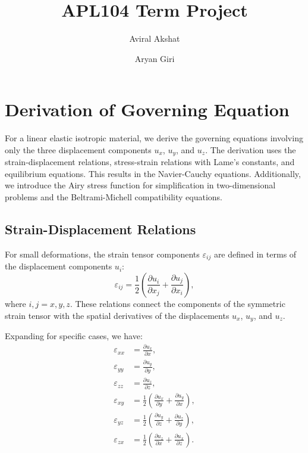 \documentclass[fleqn,10pt]{olplainarticle}
\title{APL104 Term Project}
\author[1]{Aviral Akshat}
\author[2]{Aryan Giri}
\affil[1]{2023MS11098}
\affil[2]{2023MS10602}
\begin{document}
\flushbottom
\maketitle
\thispagestyle{empty}

\section{Derivation of Governing Equation}

For a linear elastic isotropic material, we derive the governing equations involving only the three displacement components \(u_x\), \(u_y\), and \(u_z\). The derivation uses the strain-displacement relations, stress-strain relations with Lame’s constants, and equilibrium equations. This results in the Navier-Cauchy equations. Additionally, we introduce the Airy stress function for simplification in two-dimensional problems and the Beltrami-Michell compatibility equations.

\subsection{Strain-Displacement Relations}
For small deformations, the strain tensor components \(\varepsilon_{ij}\) are defined in terms of the displacement components \(u_i\):
\begin{equation}
\varepsilon_{ij} = \frac{1}{2} \left( \frac{\partial u_i}{\partial x_j} + \frac{\partial u_j}{\partial x_i} \right),
\end{equation}
where \(i, j = x, y, z\). These relations connect the components of the symmetric strain tensor with the spatial derivatives of the displacements \(u_x\), \(u_y\), and \(u_z\).

Expanding for specific cases, we have:
\begin{align}
\varepsilon_{xx} &= \frac{\partial u_x}{\partial x}, \\
\varepsilon_{yy} &= \frac{\partial u_y}{\partial y}, \\
\varepsilon_{zz} &= \frac{\partial u_z}{\partial z}, \\
\varepsilon_{xy} &= \frac{1}{2} \left( \frac{\partial u_x}{\partial y} + \frac{\partial u_y}{\partial x} \right), \\
\varepsilon_{yz} &= \frac{1}{2} \left( \frac{\partial u_y}{\partial z} + \frac{\partial u_z}{\partial y} \right), \\
\varepsilon_{zx} &= \frac{1}{2} \left( \frac{\partial u_z}{\partial x} + \frac{\partial u_x}{\partial z} \right).
\end{align}
\end{document}
